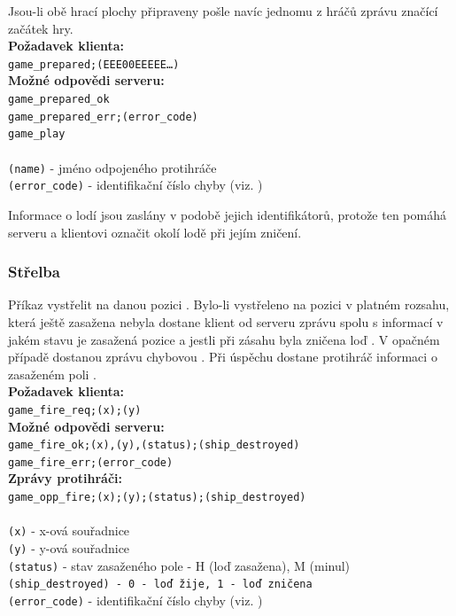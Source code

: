 \documentclass[12pt, a4paper]{article} %
\begin{document}
	\par Jsou-li obě hrací plochy připraveny pošle navíc jednomu z hráčů zprávu  značící začátek hry.\\
	\textbf{Požadavek klienta:}\\
	\texttt{game\_prepared;(EEE00EEEEE…)}\\
	\textbf{Možné odpovědi serveru:}\\
	\texttt{game\_prepared\_ok}\\
	\texttt{game\_prepared\_err;(error\_code)}\\
	\texttt{game\_play}\\\\
	\texttt{(name)} - jméno odpojeného protihráče\\
	\texttt{(error\_code)} - identifikační číslo chyby (viz. )
		
	\begin{notes}
		\item Informace o lodí jsou zaslány v podobě jejich identifikátorů, protože ten pomáhá serveru a klientovi označit okolí lodě při jejím zničení.
	\end{notes}	
	\subsubsection{Střelba}
	\par Příkaz vystřelit na danou pozici . Bylo-li vystřeleno na pozici v platném rozsahu, která ještě zasažena nebyla dostane klient od serveru zprávu spolu s informací v jakém stavu je zasažená pozice a jestli při zásahu byla zničena loď . V opačném případě dostanou zprávu chybovou .
	Při úspěchu dostane protihráč informaci o zasaženém poli .\\
	\textbf{Požadavek klienta:}\\
	\texttt{game\_fire\_req;(x);(y)}\\
	\textbf{Možné odpovědi serveru:}\\
	\texttt{game\_fire\_ok;(x),(y),(status);(ship\_destroyed)}\\
	\texttt{game\_fire\_err;(error\_code)}\\
	\textbf{Zprávy protihráči:}\\
	\texttt{game\_opp\_fire;(x);(y);(status);(ship\_destroyed)}\\\\
	\texttt{(x)} - x-ová souřadnice\\
	\texttt{(y)} - y-ová souřadnice\\
	\texttt{(status)} - stav zasaženého pole - H (loď zasažena), M (minul)\\
	\texttt{(ship\_destroyed) - 0 - loď žije, 1 - loď zničena}\\
	\texttt{(error\_code)} - identifikační číslo chyby (viz. )
\end{document}
